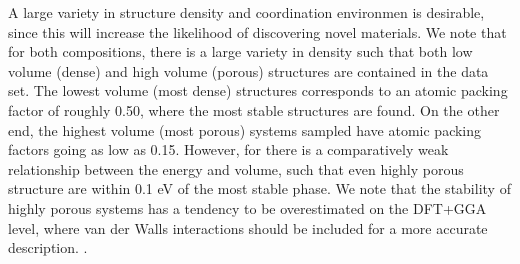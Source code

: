 A large variety in structure density and coordination environmen is desirable, since this will increase the likelihood of discovering novel materials. We note that for both compositions, there is a large variety in density such that both low volume (dense) and high volume (porous) structures are contained in the data set. The lowest volume (most dense) structures corresponds to an atomic packing factor of roughly 0.50, where the most stable structures are found. On the other end, the highest volume (most porous) systems sampled have atomic packing factors going as low as 0.15.
%
However, for \IrOthree there is a comparatively weak relationship between the energy and volume,
such that even highly porous structure are within 0.1 eV of the most stable phase. We note that the stability of highly porous systems has a tendency to be overestimated on the DFT+GGA level, where van der Walls interactions should be included for a more accurate description. \cite{}. %

%

%


